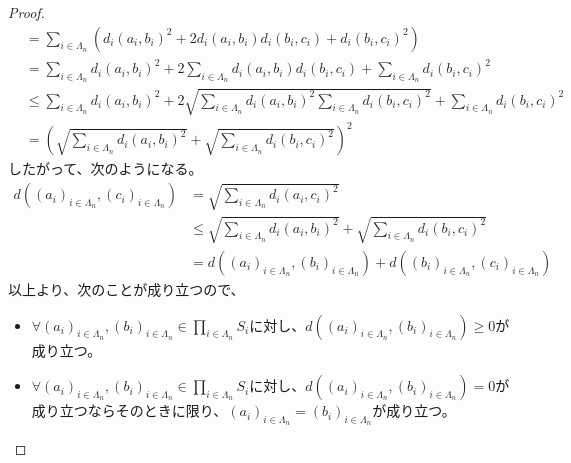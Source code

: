 \documentclass[dvipdfmx]{jsarticle}
\begin{document}
\begin{proof}
\begin{align*}
&= \sum_{i \in \varLambda_{n}} \left( {d_{i}\left( a_{i},b_{i} \right)}^{2} + 2d_{i}\left( a_{i},b_{i} \right)d_{i}\left( b_{i},c_{i} \right) + {d_{i}\left( b_{i},c_{i} \right)}^{2} \right)\\
&= \sum_{i \in \varLambda_{n}} {d_{i}\left( a_{i},b_{i} \right)}^{2} + 2\sum_{i \in \varLambda_{n}} {d_{i}\left( a_{i},b_{i} \right)d_{i}\left( b_{i},c_{i} \right)} + \sum_{i \in \varLambda_{n}} {d_{i}\left( b_{i},c_{i} \right)}^{2}\\
&\leq \sum_{i \in \varLambda_{n}} {d_{i}\left( a_{i},b_{i} \right)}^{2} + 2\sqrt{\sum_{i \in \varLambda_{n}} {d_{i}\left( a_{i},b_{i} \right)}^{2}\sum_{i \in \varLambda_{n}} {d_{i}\left( b_{i},c_{i} \right)}^{2}} + \sum_{i \in \varLambda_{n}} {d_{i}\left( b_{i},c_{i} \right)}^{2}\\
&= \left( \sqrt{\sum_{i \in \varLambda_{n}} {d_{i}\left( a_{i},b_{i} \right)}^{2}} + \sqrt{\sum_{i \in \varLambda_{n}} {d_{i}\left( b_{i},c_{i} \right)}^{2}} \right)^{2}
\end{align*}
したがって、次のようになる。
\begin{align*}
d\left( \left( a_{i} \right)_{i \in \varLambda_{n}},\left( c_{i} \right)_{i \in \varLambda_{n}} \right) &= \sqrt{\sum_{i \in \varLambda_{n}} {d_{i}\left( a_{i},c_{i} \right)}^{2}}\\
&\leq \sqrt{\sum_{i \in \varLambda_{n}} {d_{i}\left( a_{i},b_{i} \right)}^{2}} + \sqrt{\sum_{i \in \varLambda_{n}} {d_{i}\left( b_{i},c_{i} \right)}^{2}}\\
&= d\left( \left( a_{i} \right)_{i \in \varLambda_{n}},\left( b_{i} \right)_{i \in \varLambda_{n}} \right) + d\left( \left( b_{i} \right)_{i \in \varLambda_{n}},\left( c_{i} \right)_{i \in \varLambda_{n}} \right)
\end{align*}
以上より、次のことが成り立つので、
\begin{itemize}
\item
  $\forall\left( a_{i} \right)_{i \in \varLambda_{n}},\left( b_{i} \right)_{i \in \varLambda_{n}} \in \prod_{i \in \varLambda_{n}} S_{i}$に対し、$d\left( \left( a_{i} \right)_{i \in \varLambda_{n}},\left( b_{i} \right)_{i \in \varLambda_{n}} \right) \geq 0$が成り立つ。
\item
  $\forall\left( a_{i} \right)_{i \in \varLambda_{n}},\left( b_{i} \right)_{i \in \varLambda_{n}} \in \prod_{i \in \varLambda_{n}} S_{i}$に対し、$d\left( \left( a_{i} \right)_{i \in \varLambda_{n}},\left( b_{i} \right)_{i \in \varLambda_{n}} \right) = 0$が成り立つならそのときに限り、$\left( a_{i} \right)_{i \in \varLambda_{n}} = \left( b_{i} \right)_{i \in \varLambda_{n}}$が成り立つ。

\end{itemize}
\end{proof}
\end{document}

